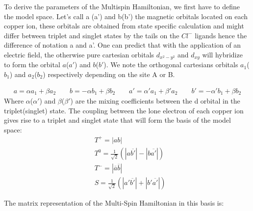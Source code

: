 \documentclass[10pt]{report}
\numberwithin{equation}{section}
\begin{document}
To derive the parameters of the Multispin Hamiltonian, we first have to define the model space.
Let's call a (a') and b(b') the magnetic orbitals located on each copper ion, these orbitals are obtained from state specific calculation and might differ between triplet and singlet states by the tails on the $Cl^-$ ligands hence the difference of notation a and a'.
One can predict that with the application of an electric field, the otherwise pure cartesian orbitals $d_{x^2-y^2}$ and $d_{xy}$ will hybridize to form the orbital $a$($a'$) and $b$($b'$).
 We note the orthogonal cartesians orbitals $a_1$($b_1$) and $a_2$($b_2$) respectively depending on the site A or B.

\begin{align}
    a=\alpha a_1 + \beta a_2 \qquad b=-\alpha b_1  + \beta b_2 \qquad a'= \alpha ' a_1 +\beta ' a_2 \qquad b'=-\alpha' b_1 +\beta b_2
\end{align}
Where $\alpha$($\alpha'$) and $\beta$($\beta'$) are the mixing coefficients between the d orbital in the triplet(singlet) state.
The coupling between the lone electron of each copper ion gives rise to a triplet and singlet state that will form the basis of the model space:
\begin{align}
    &T^+=|ab|\\
    &T^0=\frac{1}{\sqrt{2}}(|a\overline{b'}|-|b\overline{a'}|)\\
    &T^-=|\overline{a}\overline{b}|\\
    &S=\frac{1}{\sqrt{2}}(|a'\overline{b'}|+|b'\overline{a'}|)
\end{align}

The matrix representation of the Multi-Spin Hamiltonian in this basis is:
\end{document}
